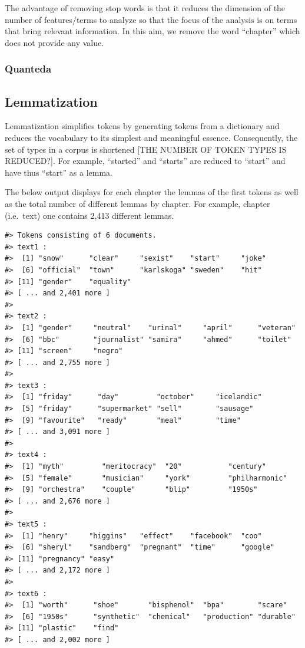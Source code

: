 \documentclass[
]{article}
\begin{document}
The advantage of removing stop words is that it reduces the dimension of
the number of features/terms to analyze so that the focus of the
analysis is on terms that bring relevant information. In this aim, we
remove the word ``chapter'' which does not provide any value.

\hypertarget{quanteda-1}{%
\subsubsection{Quanteda}\label{quanteda-1}}

\hypertarget{lemmatization}{%
\subsection{Lemmatization}\label{lemmatization}}

Lemmatization simplifies tokens by generating tokens from a dictionary
and reduces the vocabulary to its simplest and meaningful essence.
Consequently, the set of types in a corpus is shortened {[}THE NUMBER OF
TOKEN TYPES IS REDUCED?{]}. For example, ``started'' and ``starts'' are
reduced to ``start'' and have thus ``start'' as a lemma.

The below output displays for each chapter the lemmas of the first
tokens as well as the total number of different lemmas by chapter. For
example, chapter (i.e.~text) one contains 2,413 different lemmas.

\begin{verbatim}
#> Tokens consisting of 6 documents.
#> text1 :
#>  [1] "snow"      "clear"     "sexist"    "start"     "joke"     
#>  [6] "official"  "town"      "karlskoga" "sweden"    "hit"      
#> [11] "gender"    "equality" 
#> [ ... and 2,401 more ]
#> 
#> text2 :
#>  [1] "gender"     "neutral"    "urinal"     "april"      "veteran"   
#>  [6] "bbc"        "journalist" "samira"     "ahmed"      "toilet"    
#> [11] "screen"     "negro"     
#> [ ... and 2,755 more ]
#> 
#> text3 :
#>  [1] "friday"      "day"         "october"     "icelandic"  
#>  [5] "friday"      "supermarket" "sell"        "sausage"    
#>  [9] "favourite"   "ready"       "meal"        "time"       
#> [ ... and 3,091 more ]
#> 
#> text4 :
#>  [1] "myth"         "meritocracy"  "20"           "century"     
#>  [5] "female"       "musician"     "york"         "philharmonic"
#>  [9] "orchestra"    "couple"       "blip"         "1950s"       
#> [ ... and 2,676 more ]
#> 
#> text5 :
#>  [1] "henry"     "higgins"   "effect"    "facebook"  "coo"      
#>  [6] "sheryl"    "sandberg"  "pregnant"  "time"      "google"   
#> [11] "pregnancy" "easy"     
#> [ ... and 2,172 more ]
#> 
#> text6 :
#>  [1] "worth"      "shoe"       "bisphenol"  "bpa"        "scare"     
#>  [6] "1950s"      "synthetic"  "chemical"   "production" "durable"   
#> [11] "plastic"    "find"      
#> [ ... and 2,002 more ]
\end{verbatim}
\end{document}
